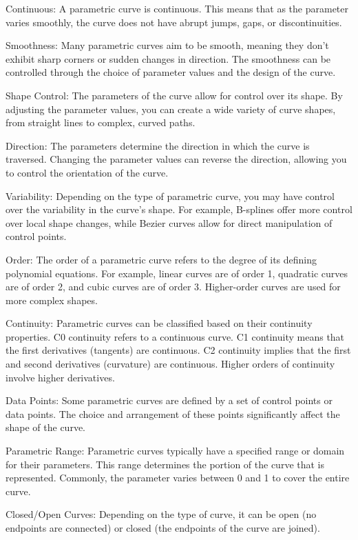 \documentclass{article}
\begin{document}
\begin{itemize}
Continuous: A parametric curve is continuous. This means that as the parameter varies smoothly, the curve does not have abrupt jumps, gaps, or discontinuities.

Smoothness: Many parametric curves aim to be smooth, meaning they don't exhibit sharp corners or sudden changes in direction. The smoothness can be controlled through the choice of parameter values and the design of the curve.

Shape Control: The parameters of the curve allow for control over its shape. By adjusting the parameter values, you can create a wide variety of curve shapes, from straight lines to complex, curved paths.

Direction: The parameters determine the direction in which the curve is traversed. Changing the parameter values can reverse the direction, allowing you to control the orientation of the curve.

Variability: Depending on the type of parametric curve, you may have control over the variability in the curve's shape. For example, B-splines offer more control over local shape changes, while Bezier curves allow for direct manipulation of control points.

Order: The order of a parametric curve refers to the degree of its defining polynomial equations. For example, linear curves are of order 1, quadratic curves are of order 2, and cubic curves are of order 3. Higher-order curves are used for more complex shapes.

Continuity: Parametric curves can be classified based on their continuity properties. C0 continuity refers to a continuous curve. C1 continuity means that the first derivatives (tangents) are continuous. C2 continuity implies that the first and second derivatives (curvature) are continuous. Higher orders of continuity involve higher derivatives.

Data Points: Some parametric curves are defined by a set of control points or data points. The choice and arrangement of these points significantly affect the shape of the curve.

Parametric Range: Parametric curves typically have a specified range or domain for their parameters. This range determines the portion of the curve that is represented. Commonly, the parameter varies between 0 and 1 to cover the entire curve.

Closed/Open Curves: Depending on the type of curve, it can be open (no endpoints are connected) or closed (the endpoints of the curve are joined).


\end{itemize}
\end{document}
